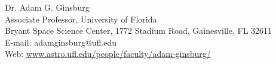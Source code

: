 \begin{center}
{\large Dr. Adam G. Ginsburg}\\
Associate Professor, University of Florida\\
Bryant Space Science Center,
1772 Stadium Road,
Gainesville, FL 32611\\
E-mail: adamginsburg@ufl.edu \\
Web: \url{www.astro.ufl.edu/people/faculty/adam-ginsburg/} %
\end{center}

